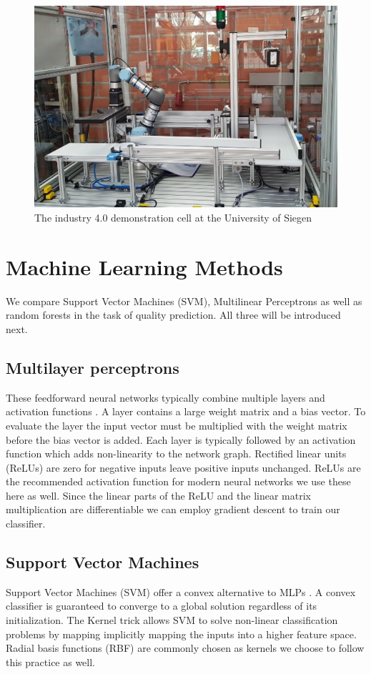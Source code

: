 \documentclass[5p,times,procedia]{elsarticle}
\begin{document}
\begin{figure}
       \includegraphics[width=.45\textwidth]{img/demozelle}
       \caption{The industry 4.0 demonstration cell at the University of Siegen}
\label{fig:ind_cell}
\end{figure}

\section{Machine Learning Methods} %

We compare Support Vector Machines (SVM), Multilinear Perceptrons
\cite{bishop2006pattern} as well as random forests in the task of
quality prediction. All three will be introduced next.

\subsection{Multilayer perceptrons}
These feedforward neural networks typically combine multiple layers
and activation functions \cite{bishop2006pattern}.
A layer contains a large weight matrix and
a bias vector. To evaluate the layer the input vector must be
multiplied with the weight matrix before the bias vector is added.
Each layer is typically followed by an activation function 
which adds non-linearity to the network graph. Rectified linear units
(ReLUs) are zero for negative inputs leave positive inputs unchanged.
ReLUs are the recommended activation function for modern neural
networks \cite{goodfellow2016deep} we use these here as well.
Since the linear parts of the ReLU and the linear matrix multiplication
are differentiable we can employ gradient descent to train our 
classifier.

\subsection{Support Vector Machines}
Support Vector Machines (SVM) offer a convex alternative to MLPs \cite{Suykens2002least}.
A convex classifier is guaranteed to converge to a global solution regardless 
of its initialization. 
The Kernel trick allows SVM to solve non-linear classification problems \cite{Suykens2002least} by mapping implicitly mapping the inputs into a higher feature space. Radial basis functions (RBF) are commonly chosen as kernels
\cite{Suykens2002least} we choose to follow this practice as well.
\end{document}
